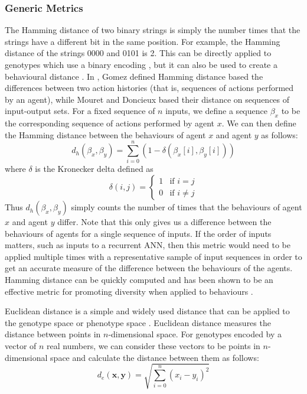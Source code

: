 \documentclass[12pt]{article} %
\begin{document}
\subsubsection{Generic Metrics}

The Hamming distance of two binary strings is simply the number times that the strings have a different bit in the same position. For example, the Hamming distance of the strings 0000 and 0101 is 2. This can be directly applied to genotypes which use a binary encoding \cite{Gomez2009}\cite{Sareni1998}, but it can also be used to create a behavioural distance \cite{Gomez2009}\cite{Mouret2012}. In \cite{Gomez2009}, Gomez defined Hamming distance based the differences between two action histories (that is, sequences of actions performed by an agent), while Mouret and Doncieux \cite{Mouret2012} based their distance on sequences of input-output sets. For a fixed sequence of $n$ inputs, we define a sequence $\beta_x$ to be the corresponding sequence of actions performed by agent $x$. We can then define the Hamming distance between the behaviours of agent $x$ and agent $y$ as follows:
\[
d_h(\beta_x,\beta_y) = \displaystyle\sum\limits_{i=0}^n \left( 1 - \delta\left(\beta_x[i], \beta_y[i]\right)\right)
\]
where $\delta$ is the Kronecker delta defined as
\[
\delta(i,j) =
 \begin{cases}
1& \text{if } i=j\\
0& \text{if } i \neq j
\end{cases}
\]
Thus $d_h(\beta_x,\beta_y)$ simply counts the number of times that the behaviours of agent $x$ and agent $y$ differ. Note that this only gives us a difference between the behaviours of agents for a single sequence of inputs. If the order of inputs matters, such as inputs to a recurrent ANN, then this metric would need to be applied multiple times with a representative sample of input sequences in order to get an accurate measure of the difference between the behaviours of the agents. Hamming distance can be quickly computed and has been shown to be an effective metric for promoting diversity when applied to behaviours \cite{Gomez2009}\cite{Mouret2012}.

Euclidean distance is a simple and widely used distance that can be applied to the genotype space or phenotype space \cite{Gomez2009}\cite{Sareni1998}. Euclidean distance measures the distance between points in $n$-dimensional space. For genotypes encoded by a vector of $n$ real numbers, we can consider these vectors to be points in $n$-dimensional space and calculate the distance between them as follows:
\[
d_e(\mathbf{x},\mathbf{y})=\sqrt{\displaystyle\sum\limits_{i=0}^n (x_i - y_i)^2}
\]
\end{document}
